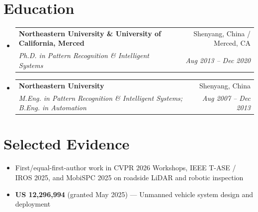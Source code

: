 \documentclass[letterpaper,9pt]{article}
\makeatletter
\newcommand{\resumeBullet}[1]{
  \item\small{#1 \vspace{-2pt}}
}
\newcommand{\resumeSubheading}[4]{
  \vspace{-1pt}\item
    \begin{tabular*}{0.97\textwidth}{l@{\extracolsep{\fill}}r}
      \textbf{#1} & #2 \\
      \textit{\small#3} & \textit{\small #4} \\
    \end{tabular*}\vspace{-5pt}
}
\newcommand{\resumeSubHeadingListStart}{\begin{itemize}[leftmargin=*]}
\newcommand{\resumeSubHeadingListEnd}{\end{itemize}}
\makeatother
\begin{document}
\section{Education}
  \resumeSubHeadingListStart
    \resumeSubheading
      {Northeastern University \& University of California, Merced}{Shenyang, China / Merced, CA}
      {Ph.D. in Pattern Recognition \& Intelligent Systems}{Aug 2013 -- Dec 2020}
    \resumeSubheading
      {Northeastern University}{Shenyang, China}
      {M.Eng. in Pattern Recognition \& Intelligent Systems; B.Eng. in Automation}{Aug 2007 -- Dec 2013}
  \resumeSubHeadingListEnd

\section{Selected Evidence}
  \resumeSubHeadingListStart
    \resumeBullet{First/equal-first-author work in CVPR 2026 Workshops, IEEE T-ASE / IROS 2025, and MobiSPC 2025 on roadside LiDAR and robotic inspection}
    \resumeBullet{\textbf{US 12,296,994} (granted May 2025) --- Unmanned vehicle system design and deployment}
  \resumeSubHeadingListEnd
\end{document}
